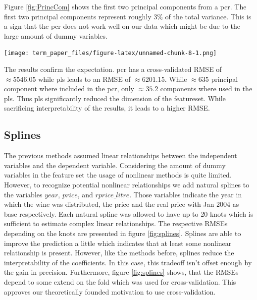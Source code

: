 \documentclass[11pt,]{article}
\let\origfigure\figure
\let\endorigfigure\endfigure
\renewenvironment{figure}[1][2] {
    \expandafter\origfigure\expandafter[H]
} {
    \endorigfigure
}
\begin{document}
Figure \ref{fig:PrincCom} shows the first two principal components from
a \ac{pcr}. The first two principal components represent roughly 3\% of
the total variance. This is a sign that the \ac{pcr} does not work well
on our data which might be due to the large amount of dummy variables.

\begin{figure}
\centering
\texttt{[image: term\_paper\_files/figure-latex/unnamed-chunk-8-1.png]}
\caption{\label{fig:PrincCom}Principal Component One and Two.}
\end{figure}

The results confirm the expectation. \ac{pcr} has a cross-validated
\ac{RMSE} of \(\approx 5546.05\) while \ac{pls} leads to an \ac{RMSE} of
\(\approx 6201.15\). While \(\approx 635\) principal component where
included in the \ac{pcr}, only \(\approx 35.2\) components where used in
the \ac{pls}. Thus \ac{pls} significantly reduced the dimension of the
featureset. While sacrificing interpretability of the results, it leads
to a higher \ac{RMSE}.

\hypertarget{splines}{%
\subsection{Splines}\label{splines}}

The previous methods assumed linear relationships between the
independent variables and the dependent variable. Considering the amount
of dummy variables in the feature set the usage of nonlinear methods is
quite limited. However, to recognize potential nonlinear relationships
we add natural splines to the variables \(year\), \(price\), and
\(rprice\_litre\). Those variables indicate the year in which the wine
was distributed, the price and the real price with Jan 2004 as base
respectively. Each natural spline was allowed to have up to 20 knots
which is sufficient to estimate complex linear relationships. The
respective \ac{RMSE}s depending on the knots are presented in figure
\ref{fig:splines}. Splines are able to improve the prediction a little
which indicates that at least some nonlinear relationship is present.
However, like the methods before, splines reduce the interpretability of
the coefficients. In this case, this tradeoff isn't offset enough by the
gain in precision. Furthermore, figure \ref{fig:splines} shows, that the
\ac{RMSE}s depend to some extend on the fold which was used for
cross-validation. This approves our theoretically founded motivation to
use cross-validation.
\end{document}
